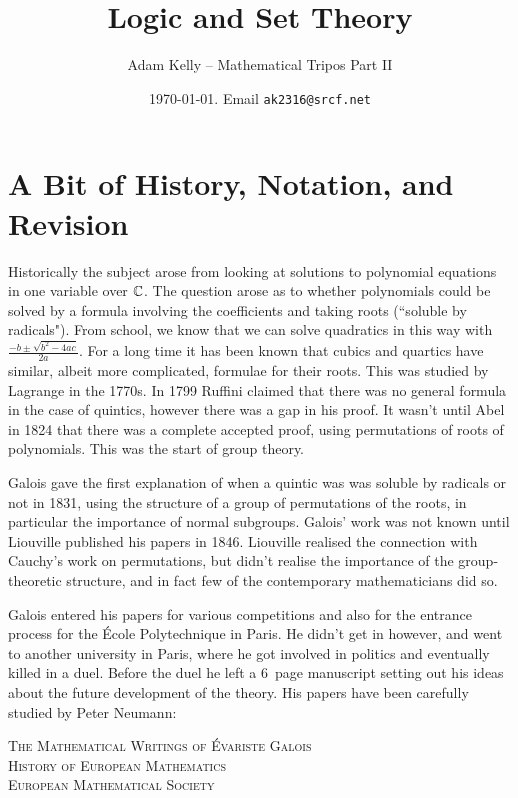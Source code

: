 \documentclass[a4paper, 10pt, twocolumn]{amsart}
\title{Logic and Set Theory}
\author{Adam Kelly -- Mathematical Tripos Part II}
\date{\today. Email \texttt{ak2316@srcf.net}}
\begin{document}
\maketitle

\section{A Bit of History, Notation, and Revision}
Historically the subject arose from looking at solutions to polynomial equations in one variable over $\mathbb{C}$. The question arose as to whether polynomials could be solved by a formula involving the coefficients and taking roots (``soluble by radicals"). From school, we know that we can solve quadratics in this way with $\frac{-b\pm\sqrt{b^2-4ac}}{2a}$. For a long time it has been known that cubics and quartics have similar, albeit more complicated, formulae for their roots. This was studied by Lagrange in the 1770s. In 1799 Ruffini claimed that there was no general formula in the case of quintics, however there was a gap in his proof. It wasn't until Abel in 1824 that there was a complete accepted proof, using permutations of roots of polynomials. This was the start of group theory.

Galois gave the first explanation of when a quintic was was soluble by radicals or not in 1831, using the structure of a group of permutations of the roots, in particular the importance of normal subgroups. Galois' work was not known until Liouville published his papers in 1846. Liouville realised the connection with Cauchy's work on permutations, but didn't realise the importance of the group-theoretic structure, and in fact few of the contemporary mathematicians did so.

Galois entered his papers for various competitions and also for the entrance process for the \'Ecole Polytechnique in Paris. He didn't get in however, and went to another university in Paris, where he got involved in politics and eventually killed in a duel. Before the duel he left a 6\textonehalf\, page manuscript setting out his ideas about the future development of the theory. His papers have been carefully studied by Peter Neumann:
\begin{center}
\textsc{
The Mathematical Writings of \'Evariste Galois\\History of European Mathematics\\European Mathematical Society
}
\end{center}
\end{document}
